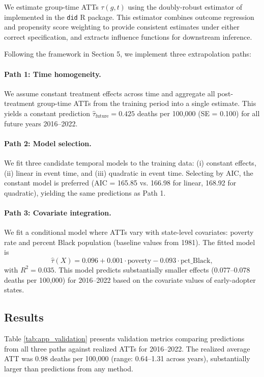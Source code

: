 We estimate group-time ATTs $\tau(g,t)$ using the doubly-robust estimator of \citet{callawayDifferenceindifferencesMultipleTime2021} implemented in the \texttt{did} R package. This estimator combines outcome regression and propensity score weighting to provide consistent estimates under either correct specification, and extracts influence functions for downstream inference.

Following the framework in Section 5, we implement three extrapolation paths:

\paragraph{Path 1: Time homogeneity.} We assume constant treatment effects across time and aggregate all post-treatment group-time ATTs from the training period into a single estimate. This yields a constant prediction $\hat{\tau}_{\text{future}} = 0.425$ deaths per 100,000 (SE = 0.100) for all future years 2016--2022.

\paragraph{Path 2: Model selection.} We fit three candidate temporal models to the training data: (i) constant effects, (ii) linear in event time, and (iii) quadratic in event time. Selecting by AIC, the constant model is preferred (AIC = 165.85 vs. 166.98 for linear, 168.92 for quadratic), yielding the same predictions as Path 1.

\paragraph{Path 3: Covariate integration.} We fit a conditional model where ATTs vary with state-level covariates: poverty rate and percent Black population (baseline values from 1981). The fitted model is
\[
\hat{\tau}(X) = 0.096 + 0.001 \cdot \text{poverty} - 0.093 \cdot \text{pct\_Black},
\]
with $R^2 = 0.035$. This model predicts substantially smaller effects (0.077--0.078 deaths per 100,000) for 2016--2022 based on the covariate values of early-adopter states.

\subsection{Results}

Table \ref{tab:app_validation} presents validation metrics comparing predictions from all three paths against realized ATTs for 2016--2022. The realized average ATT was 0.98 deaths per 100,000 (range: 0.64--1.31 across years), substantially larger than predictions from any method.

